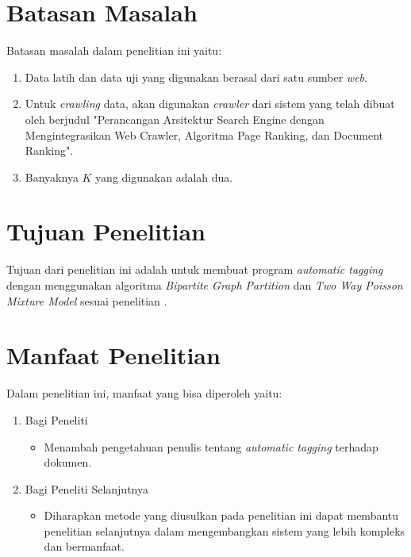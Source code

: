 \section{Batasan Masalah}

Batasan masalah dalam penelitian ini yaitu:

\begin{enumerate}
    \item Data latih dan data uji yang digunakan berasal dari satu sumber \textit{web}.
    \item Untuk \textit{crawling} data, akan digunakan \textit{crawler} dari sistem yang telah dibuat oleh \cite{khatulistiwa_2022_searchengine} berjudul "Perancangan Arsitektur Search Engine dengan Mengintegrasikan Web Crawler, Algoritma Page Ranking, dan Document Ranking".
    \item Banyaknya $K$ yang digunakan adalah dua.
\end{enumerate}

\section{Tujuan Penelitian}

Tujuan dari penelitian ini adalah untuk membuat program \textit{automatic tagging} dengan menggunakan algoritma \textit{Bipartite Graph Partition} dan \textit{Two Way Poisson Mixture Model} sesuai penelitian \cite{song2008autotag}.

\section{Manfaat Penelitian}

Dalam penelitian ini, manfaat yang bisa diperoleh yaitu:

\begin{enumerate}
    \item Bagi Peneliti
    \begin{itemize}
        \item[] Menambah pengetahuan penulis tentang \textit{automatic tagging} terhadap dokumen.
    \end{itemize}
    \item Bagi Peneliti Selanjutnya
    \begin{itemize}
        \item[] Diharapkan metode yang diusulkan pada penelitian ini dapat membantu penelitian selanjutnya dalam mengembangkan sistem yang lebih kompleks dan bermanfaat.
    \end{itemize}
\end{enumerate}

